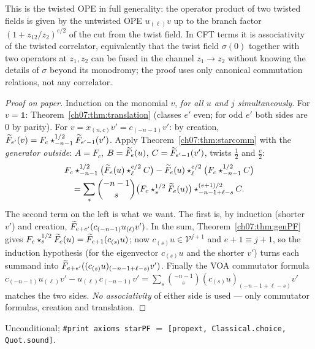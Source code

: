 \begin{physics}
This is the twisted OPE in full generality: the operator product of two twisted fields is given by the untwisted OPE $u_{(\ell)}v$ up to the branch factor $(1+z_{12}/z_2)^{e/2}$ of the cut from the twist field. In CFT terms it is associativity of the twisted correlator, equivalently that the twist field $\sigma(0)$ together with two operators at $z_1,z_2$ can be fused in the channel $z_1\to z_2$ without knowing the details of $\sigma$ beyond its monodromy; the proof uses only canonical commutation relations, not any correlator.
\end{physics}

\begin{proof}[Proof on paper]
Induction on the monomial $v$, \emph{for all $u$ and $j$ simultaneously}. For $v = \mathbf 1$:
Theorem~\ref{ch07:thm:translation} (classes $e'$ even; for odd $e'$ both sides are $0$ by
parity). For $v = x_{(n,c)}v' = c_{(-n-1)}v'$: by creation,
$\widetilde{F}_{e'}(v) = F_c\star^{1/2}_{-n-1}\widetilde{F}_{e'-1}(v')$. Apply
Theorem~\ref{ch07:thm:starcomm} with the \emph{generator outside}: $A = F_c$,
$B = \widetilde{F}_e(u)$, $C = \widetilde{F}_{e'-1}(v')$, twists $\frac12$ and $\frac e2$:
\begin{multline*}
  F_c\star^{1/2}_{-n-1}\bigl(\widetilde{F}_e(u)\star^{e/2}_\ell C\bigr) - \widetilde{F}_e(u)\star^{e/2}_\ell
  \bigl(F_c\star^{1/2}_{-n-1}C\bigr)\\
  = \sum_s\binom{-n-1}{s}\bigl(F_c\star^{1/2}_s\widetilde{F}_e(u)\bigr)\star^{(e+1)/2}_{-n-1+\ell-s}C.
\end{multline*}
The second term on the left is what we want. The first is, by induction (shorter $v'$) and
creation, $\widetilde{F}_{e+e'}(c_{(-n-1)}u_{(\ell)}v')$. In the sum, Theorem~\ref{ch07:thm:genPF}
gives $F_c\star^{1/2}_s\widetilde{F}_e(u) = \widetilde{F}_{e+1}(c_{(s)}u)$; now $c_{(s)}u\in\mathcal
V^{j+1}$ and $e+1\equiv j+1$, so the induction hypothesis (for the eigenvector $c_{(s)}u$ and the
shorter $v'$) turns each summand into $\widetilde{F}_{e+e'}((c_{(s)}u)_{(-n-1+\ell-s)}v')$. Finally the
VOA commutator formula $c_{(-n-1)}u_{(\ell)}v' - u_{(\ell)}c_{(-n-1)}v' = \sum_s\binom{-n-1}s
(c_{(s)}u)_{(-n-1+\ell-s)}v'$ matches the two sides. \emph{No associativity} of either side is
used --- only commutator formulas, creation and translation.
\end{proof}

\begin{status}
Unconditional; \verb|#print axioms starPF| $=$ \texttt{[propext, Classical.choice,
Quot.sound]}.
\end{status}

